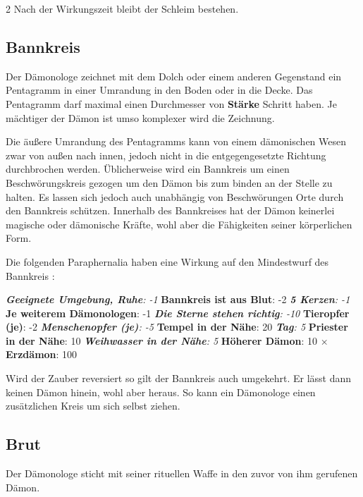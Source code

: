 \begin{multicols*}{2}
Nach der Wirkungszeit bleibt der Schleim bestehen.



\subsection{Bannkreis}

Der Dämonologe zeichnet mit dem Dolch oder einem anderen Gegenstand ein Pentagramm in einer Umrandung in den Boden oder in die Decke. Das Pentagramm darf maximal einen Durchmesser von \textbf{Stärke} Schritt haben. Je mächtiger der Dämon ist umso komplexer wird die Zeichnung.

Die äußere Umrandung des Pentagramms kann von einem dämonischen Wesen zwar von außen nach innen, jedoch nicht in die entgegengesetzte Richtung durchbrochen werden. Üblicherweise wird ein Bannkreis um einen Beschwörungskreis gezogen um den Dämon bis zum binden an der Stelle zu halten. Es lassen sich jedoch auch unabhängig von Beschwörungen Orte durch den Bannkreis schützen. Innerhalb des Bannkreises hat der Dämon keinerlei magische oder dämonische Kräfte, wohl aber die Fähigkeiten seiner körperlichen Form.

Die folgenden Paraphernalia haben eine Wirkung auf den Mindestwurf des Bannkreis :

\textit{ \textbf{Geeignete Umgebung, Ruhe}: -1 } \textbf{Bannkreis ist aus Blut}: -2 \textit{ \textbf{5 Kerzen}: -1 } \textbf{Je weiterem Dämonologen}: -1 \textit{ \textbf{Die Sterne stehen richtig}: -10 } \textbf{Tieropfer (je)}: -2 \textit{ \textbf{Menschenopfer (je)}: -5 } \textbf{Tempel in der Nähe}: 20 \textit{ \textbf{Tag}: 5 } \textbf{Priester in der Nähe}: 10 \textit{ \textbf{Weihwasser in der Nähe}: 5  } \textbf{Höherer Dämon}: 10 × \textbf{Erzdämon}: 100

Wird der Zauber reversiert so gilt der Bannkreis auch umgekehrt. Er lässt dann keinen Dämon hinein, wohl aber heraus. So kann ein Dämonologe einen zusätzlichen Kreis um sich selbst ziehen.



\subsection{Brut}

Der Dämonologe sticht mit seiner rituellen Waffe in den zuvor von ihm gerufenen Dämon.


\end{multicols*}
